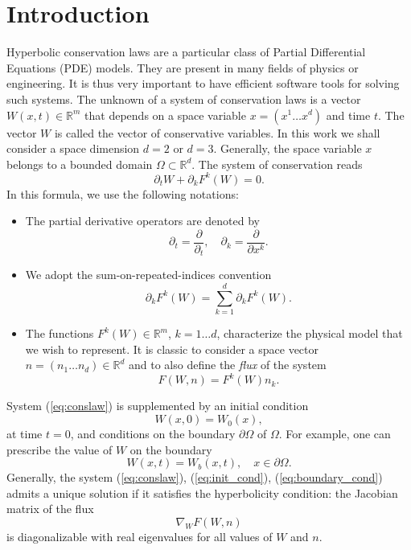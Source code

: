 \documentclass[preprint]{sig-alternate}
\begin{document}
\section{Introduction}
Hyperbolic conservation laws are a particular class of Partial Differential Equations (PDE) models. They are present in many fields of physics or engineering. It is thus very important to have efficient software tools for solving such systems.
The unknown of a system of conservation laws is a vector $W(x,t)\in \mathbb{R}^m$ that depends on a space variable $x=(x^1\ldots x^d)$ and time $t$. The vector $W$ is called the vector of conservative variables. In this work we shall consider a space dimension $d=2$ or $d=3$. Generally, the space variable $x$ belongs to a bounded domain $\Omega\subset \mathbb{R}^d$. The system of conservation reads
\begin{equation}
\partial_t W + \partial_k F^k(W)=0. \label{eq:conslaw}
\end{equation}
In this formula, we use the following notations:
\begin{itemize}
\item The partial derivative operators  are denoted by $$\partial_t = \frac{\partial}{\partial_t},\quad \partial_k = \frac{\partial}{\partial {x^k}}.$$
\item We adopt the sum-on-repeated-indices convention $$\partial_k F^k(W) =\sum_{k=1}^{d}\partial_k F^k(W).$$
\item The functions $F^k(W)\in \mathbb{R}^m$, $k=1\ldots d$, characterize the physical model that we wish to represent. It is classic to consider a space vector $n=(n_1\ldots n_d)\in\mathbb{R}^d$ and to also define the \textit{flux} of the system $$F(W,n)=F^k(W)n_k.$$
\end{itemize}
System (\ref{eq:conslaw}) is supplemented by an initial condition
\begin{equation}\label{eq:init_cond}
W(x,0)=W_0(x),
\end{equation}
at time $t=0$, and conditions on the boundary $\partial \Omega$ of $\Omega$. For example, one can prescribe the value of $W$ on the boundary
\begin{equation}\label{eq:boundary_cond}
W(x,t)=W_b(x,t),\quad x\in\partial \Omega.
\end{equation}
Generally, the system (\ref{eq:conslaw}), (\ref{eq:init_cond}), (\ref{eq:boundary_cond}) admits a unique solution if it satisfies the hyperbolicity condition: the Jacobian matrix of the flux $$\nabla_W F(W,n)$$ is diagonalizable with real eigenvalues for all values of $W$ and $n$.
\end{document}
